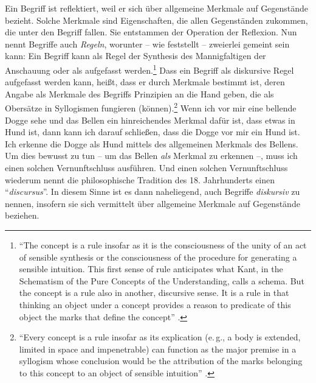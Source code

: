 Ein Begriff ist reflektiert, weil er sich über allgemeine
Merkmale auf Gegenstände bezieht. Solche Merkmale sind Eigenschaften, die allen
Gegenständen zukommen, die unter den Begriff fallen. Sie entstammen der
Operation der Reflexion. Nun nennt  Begriffe auch
\emph{Regeln}, worunter -- wie
 feststellt --
zweierlei gemeint sein kann: Ein Begriff kann als Regel der Synthesis des
Mannigfaltigen der Anschauung oder als  aufgefasst
werden.\footnote{\enquote{The concept is a rule insofar as it is the
consciousness of the unity of an act of sensible synthesis or the consciousness
of the procedure for generating a sensible intuition. This first sense of rule
anticipates what Kant, in the Schematism of the Pure Concepts of the
Understanding, calls a schema. But the concept is a rule also in another,
discursive sense. It is a rule in that thinking an object under a concept
provides a reason to predicate of this object the marks that define the concept}
\parencite[][50]{Longuenesse:KantandtheCapacitytoJudge1998}.} Dass ein Begriff
als diskursive Regel aufgefasst werden kann, heißt, dass er durch
Merkmale bestimmt ist, deren Angabe als Merkmale des Begriffs
Prinzipien an die Hand geben, die 
als Obersätze in Syllogismen fungieren (können).\footnote{\enquote{Every concept
is a rule insofar as its explication (e.\,g., a body is extended, limited in
space and impenetrable) can function as the major premise in a syllogism whose
conclusion would be the attribution of the marks belonging to this concept to an
object of sensible intuition}
\parencite[][50]{Longuenesse:KantandtheCapacitytoJudge1998}.}
Wenn ich vor mir eine bellende Dogge sehe und das Bellen ein
hinreichendes Merkmal dafür ist, dass etwas in Hund ist, dann kann ich
darauf schließen, dass die Dogge vor mir ein Hund ist. Ich erkenne die Dogge als Hund mittels des
allgemeinen Merkmals des Bellens. Um dies bewusst zu tun -- um das Bellen
\emph{als} Merkmal zu erkennen --, muss ich einen solchen Vernunftschluss
ausführen. Und einen solchen Vernunftschluss wiederum nennt die philosophische
Tradition des 18. Jahrhunderts einen \enquote{\emph{discursus}}. In
diesem Sinne ist es dann naheliegend, auch Begriffe \emph{diskursiv}
zu nennen, insofern sie sich vermittelt über allgemeine Merkmale auf
Gegenstände beziehen.

